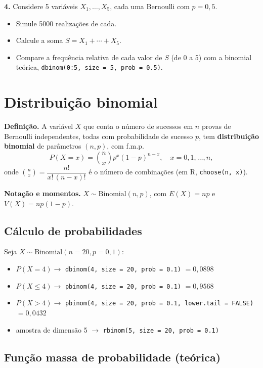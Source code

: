 \documentclass[
  portuguese,
  11pt,
  openany]{book}
\providecommand{\tightlist}{%
  \setlength{\itemsep}{0pt}\setlength{\parskip}{0pt}}
\begin{document}
\textbf{4.} Considere 5 variáveis \(X_1, \ldots, X_5\), cada uma Bernoulli com \(p = 0{,}5\).

\begin{itemize}
\tightlist
\item
  Simule 5000 realizações de cada.
\item
  Calcule a soma \(S = X_1 + \cdots + X_5\).
\item
  Compare a frequência relativa de cada valor de \(S\) (de 0 a 5) com a binomial teórica,
  \texttt{dbinom(0:5,\ size\ =\ 5,\ prob\ =\ 0.5)}.
\end{itemize}

\section{Distribuição binomial}\label{distribuiuxe7uxe3o-binomial}

\textbf{Definição.} A variável \(X\) que conta o número de sucessos em \(n\) provas de Bernoulli
independentes, todas com probabilidade de sucesso \(p\), tem \textbf{distribuição binomial} de
parâmetros \((n, p)\), com f.m.p.
\[P(X = x) = \binom{n}{x} p^x (1-p)^{n-x}, \quad x = 0, 1, \ldots, n,\]
onde \(\binom{n}{x} = \dfrac{n!}{x!\,(n-x)!}\) é o número de combinações (em R, \texttt{choose(n,\ x)}).

\textbf{Notação e momentos.} \(X \sim \text{Binomial}(n, p)\), com \(E(X) = np\) e
\(V(X) = np(1-p)\).

\subsection{Cálculo de probabilidades}\label{cuxe1lculo-de-probabilidades-1}

Seja \(X \sim \text{Binomial}(n = 20, p = 0{,}1)\):

\begin{itemize}
\tightlist
\item
  \(P(X = 4) \to\) \texttt{dbinom(4,\ size\ =\ 20,\ prob\ =\ 0.1)} \(= 0{,}0898\)
\item
  \(P(X \leq 4) \to\) \texttt{pbinom(4,\ size\ =\ 20,\ prob\ =\ 0.1)} \(= 0{,}9568\)
\item
  \(P(X > 4) \to\) \texttt{pbinom(4,\ size\ =\ 20,\ prob\ =\ 0.1,\ lower.tail\ =\ FALSE)} \(= 0{,}0432\)
\item
  amostra de dimensão 5 \(\to\) \texttt{rbinom(5,\ size\ =\ 20,\ prob\ =\ 0.1)}
\end{itemize}

\subsection{Função massa de probabilidade (teórica)}\label{funuxe7uxe3o-massa-de-probabilidade-teuxf3rica}
\end{document}
